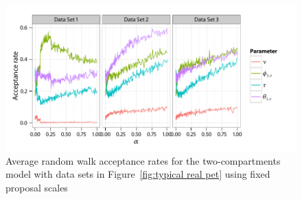 \begin{figure}[t]
  \linespread{1.1}\selectfont
  \includegraphics[width=\linewidth]{fig_src/Fixed_Proposal}
  \caption[Acceptance rates of non-adaptive \protect\smc algorithms]
  {Average random walk acceptance rates for the two-compartments \pet model
    with data sets in Figure~\ref{fig:typical real pet} using fixed proposal
    scales}
  \label{fig:pet fixed proposal}
\end{figure}
